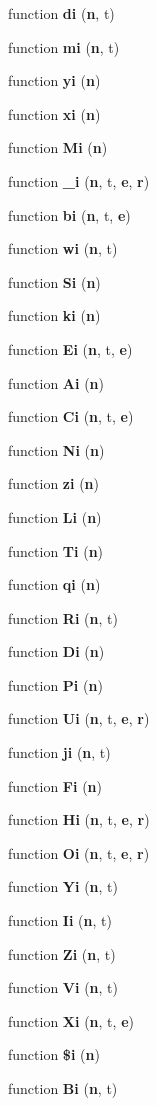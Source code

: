 \begin{DoxyCompactItemize}
function {\bf di} ({\bf n}, t)
\item 
function {\bf mi} ({\bf n}, t)
\item 
function {\bf yi} ({\bf n})
\item 
function {\bf xi} ({\bf n})
\item 
function {\bf Mi} ({\bf n})
\item 
function {\bf \+\_\+i} ({\bf n}, t, {\bf e}, {\bf r})
\item 
function {\bf bi} ({\bf n}, t, {\bf e})
\item 
function {\bf wi} ({\bf n}, t)
\item 
function {\bf Si} ({\bf n})
\item 
function {\bf ki} ({\bf n})
\item 
function {\bf Ei} ({\bf n}, t, {\bf e})
\item 
function {\bf Ai} ({\bf n})
\item 
function {\bf Ci} ({\bf n}, t, {\bf e})
\item 
function {\bf Ni} ({\bf n})
\item 
function {\bf zi} ({\bf n})
\item 
function {\bf Li} ({\bf n})
\item 
function {\bf Ti} ({\bf n})
\item 
function {\bf qi} ({\bf n})
\item 
function {\bf Ri} ({\bf n}, t)
\item 
function {\bf Di} ({\bf n})
\item 
function {\bf Pi} ({\bf n})
\item 
function {\bf Ui} ({\bf n}, t, {\bf e}, {\bf r})
\item 
function {\bf ji} ({\bf n}, t)
\item 
function {\bf Fi} ({\bf n})
\item 
function {\bf Hi} ({\bf n}, t, {\bf e}, {\bf r})
\item 
function {\bf Oi} ({\bf n}, t, {\bf e}, {\bf r})
\item 
function {\bf Yi} ({\bf n}, t)
\item 
function {\bf Ii} ({\bf n}, t)
\item 
function {\bf Zi} ({\bf n}, t)
\item 
function {\bf Vi} ({\bf n}, t)
\item 
function {\bf Xi} ({\bf n}, t, {\bf e})
\item 
function {\bf \$i} ({\bf n})
\item 
function {\bf Bi} ({\bf n}, t)
\item 

\end{DoxyCompactItemize}
